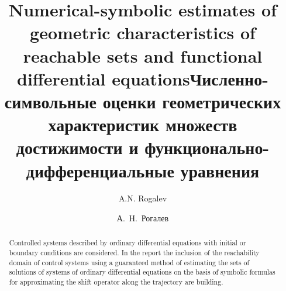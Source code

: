 \begin{englishtitle} %
\title{Numerical-symbolic estimates of geometric characteristics of reachable sets and functional differential equations}
\author{A.N. Rogalev 
}
\maketitle
\begin{abstract}
Controlled systems described by ordinary differential equations with initial or boundary conditions are considered.  In the report  the inclusion of the reachability domain of control systems using a guaranteed method of estimating the sets of solutions of systems of ordinary differential equations on the basis of symbolic formulas for approximating the shift operator along the trajectory are building.

\end{abstract}
\end{englishtitle}


\iffalse
\documentclass[12pt]{llncs}


\usepackage{iftex}

\ifPDFTeX
\usepackage[T2A]{fontenc}
\usepackage[utf8]{inputenc} %
\usepackage[english,russian]{babel}
\fi

\usepackage{todonotes}

\usepackage[russian]{nla}



\fi
%

\title{Численно-символьные оценки геометрических характеристик множеств достижимости и функционально-дифференциальные уравнения
}
\author{А.~Н.~Рогалев 
} %

